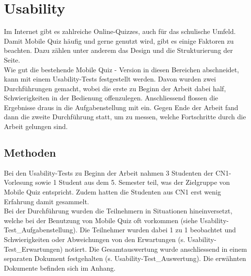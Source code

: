 






\section{Usability}
Im Internet gibt es zahlreiche Online-Quizzes, auch für das schulische Umfeld. Damit Mobile Quiz häufig und gerne genutzt wird, gibt es einige Faktoren zu beachten. \cite{marketingfire.de} Dazu zählen unter anderem das Design und die Strukturierung der Seite. \\

Wie gut die bestehende Mobile Quiz - Version in diesen Bereichen abschneidet, kann mit einem \gls{Usability-Tests} festgestellt werden. Davon wurden zwei Durchführungen gemacht, wobei die erste zu Beginn der Arbeit dabei half, Schwierigkeiten in der Bedienung offenzulegen. Anschliessend flossen die Ergebnisse draus in die Aufgabenstellung mit ein. Gegen Ende der Arbeit fand dann die zweite Durchführung statt, um zu messen, welche Fortschritte durch die Arbeit gelungen sind.

\subsection{Methoden}
Bei den \gls{Usability-Tests} zu Beginn der Arbeit nahmen 3 Studenten der \acrfull{CN1}-Vorlesung sowie 1 Student aus dem 5. Semester teil, was der Zielgruppe von Mobile Quiz entspricht. Zudem hatten die Studenten aus \acrshort{CN1} erst wenig Erfahrung damit gesammelt. \\
Bei der Durchführung wurden die Teilnehmern in Situationen hineinversetzt, welche bei der Benutzung von Mobile Quiz oft vorkommen (siehe Usability-Test\_Aufgabenstellung). Die Teilnehmer wurden dabei 1 zu 1 beobachtet und Schwierigkeiten oder Abweichungen von den Erwartungen (s. Usability-Test\_Erwartungen) notiert. Die Gesamtauswertung wurde anschliessend in einem separaten Dokument festgehalten (s. Usability-Test\_Auswertung). Die erwähnten Dokumente befinden sich im Anhang.


